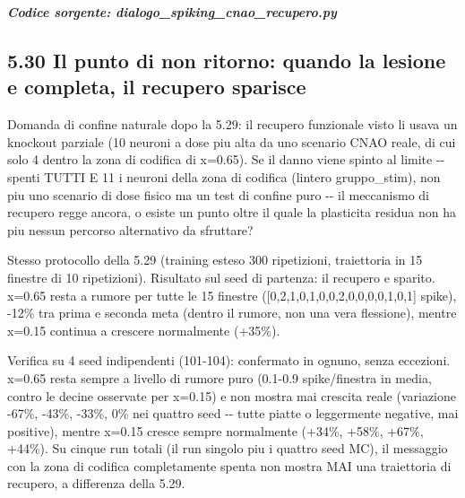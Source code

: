 \documentclass[
  italian,
]{article}
\begin{document}
\textit{\textbf{Codice sorgente: dialogo\_\allowbreak{}spiking\_\allowbreak{}cnao\_\allowbreak{}recupero.py}}


\subsection{5.30 Il punto di non ritorno: quando la lesione e\textquotesingle{} completa, il recupero sparisce}\label{il-punto-di-non-ritorno-quando-la-lesione-e-completa-il-recupero-sparisce}

Domanda di confine naturale dopo la 5.29: il recupero funzionale visto li\textquotesingle{} usava un knockout parziale (10 neuroni a dose piu\textquotesingle{} alta da uno scenario CNAO reale, di cui solo 4 dentro la zona di codifica di x=0.65). Se il danno viene spinto al limite -\/- spenti TUTTI E 11 i neuroni della zona di codifica (l\textquotesingle intero gruppo\_\allowbreak{}stim), non piu\textquotesingle{} uno scenario di dose fisico ma un test di confine puro -\/- il meccanismo di recupero regge ancora, o esiste un punto oltre il quale la plasticita\textquotesingle{} residua non ha piu\textquotesingle{} nessun percorso alternativo da sfruttare?

Stesso protocollo della 5.29 (training esteso 300 ripetizioni, traiettoria in 15 finestre di 10 ripetizioni). Risultato sul seed di partenza: il recupero e\textquotesingle{} sparito. x=0.65 resta a rumore per tutte le 15 finestre ({[}0,2,1,0,1,0,0,2,0,0,0,0,1,0,1{]} spike), -12\% tra prima e seconda meta\textquotesingle{} (dentro il rumore, non una vera flessione), mentre x=0.15 continua a crescere normalmente (+35\%).

Verifica su 4 seed indipendenti (101-104): confermato in ognuno, senza eccezioni. x=0.65 resta sempre a livello di rumore puro (0.1-0.9 spike/finestra in media, contro le decine osservate per x=0.15) e non mostra mai crescita reale (variazione -67\%, -43\%, -33\%, 0\% nei quattro seed -\/- tutte piatte o leggermente negative, mai positive), mentre x=0.15 cresce sempre normalmente (+34\%, +58\%, +67\%, +44\%). Su cinque run totali (il run singolo piu\textquotesingle{} i quattro seed MC), il messaggio con la zona di codifica completamente spenta non mostra MAI una traiettoria di recupero, a differenza della 5.29.
\end{document}
